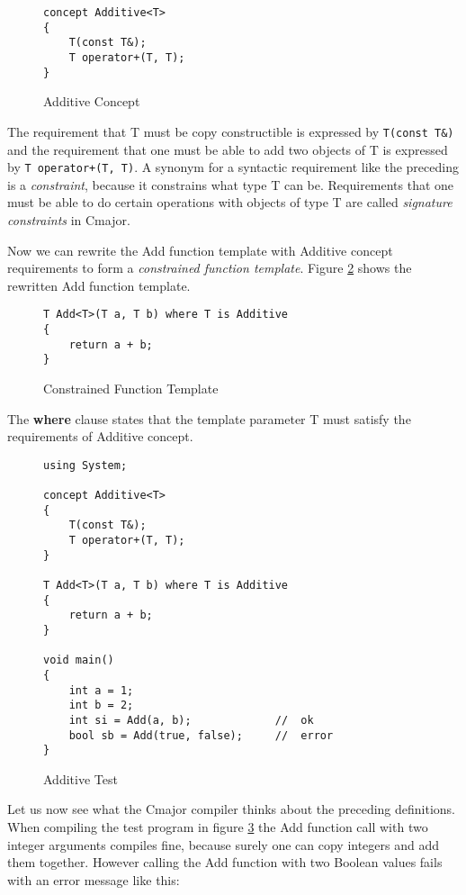 \documentclass[oneside, a4paper, 11pt]{article}
\begin{document}
\begin{figure}[htb]\caption{Additive Concept}\label{fig:additive}
\begin{lstlisting}[frame=trBL]
concept Additive<T>
{
    T(const T&);
    T operator+(T, T);
}
\end{lstlisting}
\end{figure}

The requirement that T must be copy constructible is expressed by \verb|T(const T&)| and
the requirement that one must be able to add two objects of T is expressed by \verb|T operator+(T, T)|.
A synonym for a syntactic requirement like the preceding is a \emph{constraint},
because it constrains what type T can be.
Requirements that one must be able to do certain operations with objects of type T are called
\emph{signature constraints} in Cmajor.

Now we can rewrite the Add function template with Additive concept requirements to form a
\emph{constrained function template}. Figure \ref{fig:constrainedfuntemplate} shows the
rewritten Add function template.

\begin{figure}[htb]\caption{Constrained Function Template}\label{fig:constrainedfuntemplate}
\begin{lstlisting}[frame=trBL]
T Add<T>(T a, T b) where T is Additive
{
    return a + b;
}
\end{lstlisting}
\end{figure}

The \textbf{where} clause states that the template parameter T must satisfy the requirements of Additive concept.

\begin{figure}[htb]\caption{Additive Test}\label{fig:additivetest}
\begin{lstlisting}[frame=trBL]
using System;

concept Additive<T>
{
    T(const T&);
    T operator+(T, T);
}

T Add<T>(T a, T b) where T is Additive
{
    return a + b;
}

void main()
{
    int a = 1;
    int b = 2;
    int si = Add(a, b);             //  ok
    bool sb = Add(true, false);     //  error
}
\end{lstlisting}
\end{figure}

Let us now see what the Cmajor compiler thinks about the preceding definitions.
When compiling the test program in figure \ref{fig:additivetest} the
Add function call with two integer arguments compiles fine,
because surely one can copy integers and add them together.
However calling the Add function with two Boolean values fails with an error message like this:
\end{document}
